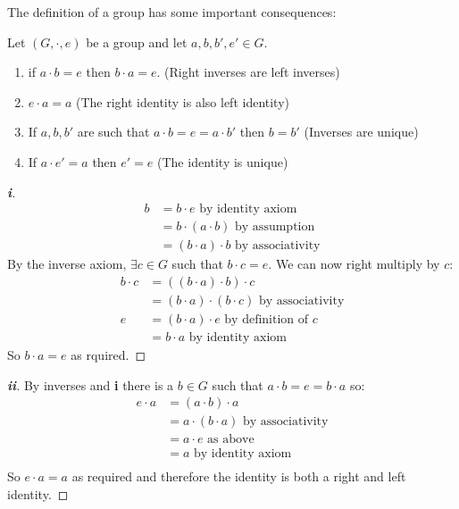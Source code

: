 \documentclass[../main.tex]{subfiles}
\begin{document}
The definition of a group has some important consequences:
\begin{proposition}
  Let $(G, \cdot, e)$ be a group and let $a, b, b', e' \in G$.
  \begin{enumerate}
    \item if $a \cdot b = e$ then $b \cdot a = e$. (Right inverses are left inverses)
    \item $e \cdot a = a$ (The right identity is also left identity)
    \item If $a, b, b'$ are such that $a \cdot b = e = a \cdot b'$ then $b = b'$ (Inverses are unique)
    \item If $a \cdot e' = a$ then $e' = e$ (The identity is unique)
  \end{enumerate}
  \label{groupProp}
\end{proposition}
\begin{proof}[\textbf{i}]
 \begin{align*}
   b &= b \cdot e \text{ by identity axiom} \\
     &= b \cdot (a \cdot b) \text{ by assumption} \\
     &= (b \cdot a) \cdot b \text{ by associativity}
 \end{align*}
 By the inverse axiom, $\exists c \in G$ such that $b \cdot c = e$.
 We can now right multiply by $c$:
 \begin{align*}
  b \cdot c &= ((b \cdot a) \cdot b) \cdot c \\
            &= (b \cdot a) \cdot (b \cdot c) \text{ by associativity} \\
          e &= (b \cdot a) \cdot e \text{ by definition of $c$} \\
            &= b \cdot a \text{ by identity axiom}
 \end{align*}
 So $b \cdot a = e$ as rquired.
\end{proof}
\begin{proof}[\textbf{ii}]
  By inverses and \textbf{i} there is a $b \in G$ such that $a \cdot b = e = b \cdot a$ so:
  \begin{align*}
    e \cdot a &= (a \cdot b) \cdot a \\
              &= a \cdot (b \cdot a) \text{ by associativity} \\
              &= a \cdot e \text{ as above} \\
              &= a \text{ by identity axiom} \\
  \end{align*}
  So $e \cdot a = a$ as required and therefore the identity is both a right and left identity.
\end{proof}
\end{document}
